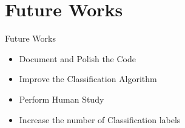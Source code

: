 \section{Future Works}
\begin{frame}{Future Works}
\begin{itemize}
    \item Document and Polish the Code
    \item Improve the Classification Algorithm
    \item Perform Human Study
    \item Increase the number of Classification labels
\end{itemize}
\end{frame}